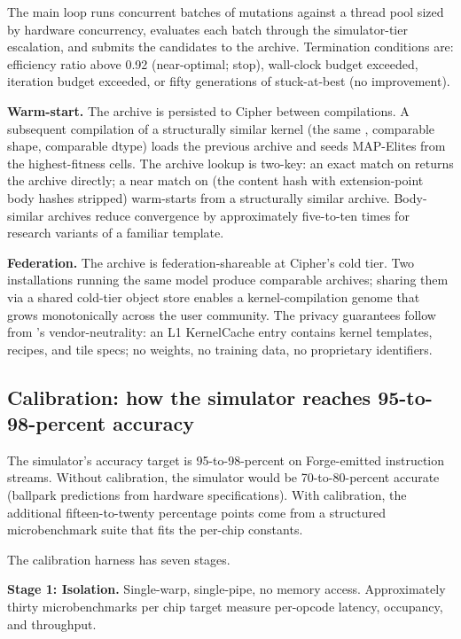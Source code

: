 The main loop runs concurrent batches of mutations against a thread pool sized by hardware concurrency, evaluates each batch through the simulator-tier escalation, and submits the candidates to the archive.
Termination conditions are: efficiency ratio above 0.92 (near-optimal; stop), wall-clock budget exceeded, iteration budget exceeded, or fifty generations of stuck-at-best (no improvement).

\textbf{Warm-start.}
The archive is persisted to Cipher between compilations.
A subsequent compilation of a structurally similar kernel (the same , comparable shape, comparable dtype) loads the previous archive and seeds MAP-Elites from the highest-fitness cells.
The archive lookup is two-key: an exact match on  returns the archive directly; a near match on  (the content hash with extension-point body hashes stripped) warm-starts from a structurally similar archive.
Body-similar archives reduce convergence by approximately five-to-ten times for research variants of a familiar template.

\textbf{Federation.}
The archive is federation-shareable at Cipher's cold tier.
Two installations running the same model produce comparable archives; sharing them via a shared cold-tier object store enables a kernel-compilation genome that grows monotonically across the user community.
The privacy guarantees follow from 's vendor-neutrality: an L1 KernelCache entry contains kernel templates, recipes, and tile specs; no weights, no training data, no proprietary identifiers.

\subsection{Calibration: how the simulator reaches 95-to-98-percent accuracy}
\label{sec:mimic-calibration}

The simulator's accuracy target is 95-to-98-percent on Forge-emitted instruction streams.
Without calibration, the simulator would be 70-to-80-percent accurate (ballpark predictions from hardware specifications).
With calibration, the additional fifteen-to-twenty percentage points come from a structured microbenchmark suite that fits the per-chip constants.

The calibration harness has seven stages.

\textbf{Stage 1: Isolation.}
Single-warp, single-pipe, no memory access.
Approximately thirty microbenchmarks per chip target measure per-opcode latency, occupancy, and throughput.

